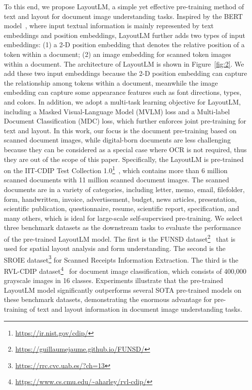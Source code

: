 \documentclass[sigconf]{acmart}
\begin{document}
To this end, we propose LayoutLM, a simple yet effective pre-training method of text and layout for document image understanding tasks. Inspired by the BERT model~\citep{devlin-etal-2019-bert}, where input textual information is mainly represented by text embeddings and position embeddings, LayoutLM further adds two types of input embeddings: (1) a 2-D position embedding that denotes the relative position of a token within a document; (2) an image embedding for scanned token images within a document. The architecture of LayoutLM is shown in Figure~\ref{fig:2}. We add these two input embeddings because the 2-D position embedding can capture the relationship among tokens within a document, meanwhile the image embedding can capture some appearance features such as font directions, types, and colors. In addition, we adopt a multi-task learning objective for LayoutLM, including a Masked Visual-Language Model (MVLM) loss and a Multi-label Document Classification (MDC) loss, which further enforces joint pre-training for text and layout. In this work, our focus is the document pre-training based on scanned document images, while digital-born documents are less challenging because they can be considered as a special case where OCR is not required, thus they are out of the scope of this paper. Specifically, the LayoutLM is pre-trained on the IIT-CDIP Test Collection 1.0\footnote{\url{https://ir.nist.gov/cdip/}}~\citep{Lewis:2006:BTC:1148170.1148307}, which contains more than 6 million scanned documents with 11 million scanned document images. The scanned documents are in a variety of categories, including letter, memo, email, filefolder, form, handwritten, invoice, advertisement, budget, news articles, presentation, scientific publication, questionnaire, resume, scientific report, specification, and many others, which is ideal for large-scale self-supervised pre-training. We select three benchmark datasets as the downstream tasks to evaluate the performance of the pre-trained LayoutLM model. 
The first is the FUNSD dataset\footnote{\url{https://guillaumejaume.github.io/FUNSD/}}~\citep{Jaume2019FUNSDAD} that is used for spatial layout analysis and form understanding. The second is the SROIE dataset\footnote{\url{https://rrc.cvc.uab.es/?ch=13}} for Scanned Receipts Information Extraction. The third is the RVL-CDIP dataset\footnote{\url{https://www.cs.cmu.edu/~aharley/rvl-cdip/}}~\citep{Harley2015EvaluationOD} for document image classification, which consists of 400,000 grayscale images in 16 classes. 
Experiments illustrate that the pre-trained LayoutLM model significantly outperforms several SOTA pre-trained models on these benchmark datasets, demonstrating the enormous advantage for pre-training of text and layout information in document image understanding tasks.
\end{document}
